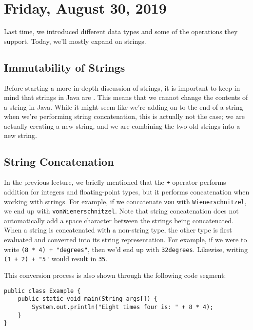 \newpage
\section{Friday, August 30, 2019}

Last time, we introduced different data types and some of the operations they support. Today, we'll mostly expand on strings. 


\subsection{Immutability of Strings}

Before starting a more in-depth discussion of strings, it is important to keep in mind that strings in Java are . This means that we cannot change the contents of a string in Java. While it might seem like we're adding on to the end of a string when we're performing string concatenation, this is actually not the case; we are actually creating a new string, and we are combining the two old strings into a new string. 


\subsection{String Concatenation}

In the previous lecture, we briefly mentioned that the \verb!+! operator performs addition for integers and floating-point types, but it performs concatenation when working with strings. For example, if we concatenate \verb!von! with \verb!Wienerschnitzel!, we end up with \verb!vonWienerschnitzel!. Note that string concatenation does not automatically add a space character between the strings being concatenated. \\

When a string is concatenated with a non-string type, the other type is first evaluated and converted into its string representation. For example, if we were to write \verb!(8 * 4) + "degrees"!, then we'd end up with \verb!32degrees!. Likewise, writing \verb!(1 + 2) + "5"! would result in \verb!35!. 


This conversion process is also shown through the following code segment:

\begin{lstlisting}
public class Example {
    public static void main(String args[]) {
        System.out.println("Eight times four is: " + 8 * 4);
    }
}
\end{lstlisting}

